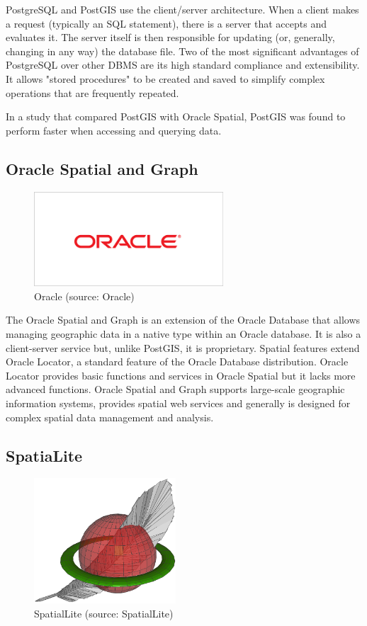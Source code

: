 PostgreSQL and PostGIS use the client/server architecture. When a
client makes a request (typically an SQL statement), there is a server
that accepts and evaluates it. The server itself is then responsible
for updating (or, generally, changing in any way) the database
file. Two of the most significant advantages of PostgreSQL over other
DBMS are its high standard compliance and extensibility. It allows
"stored procedures" to be created and saved to simplify complex
operations that are frequently repeated.

In a study that compared PostGIS with Oracle Spatial, PostGIS was
found to perform faster when accessing and querying
data.\cite{postgis}

	
\subsection{Oracle Spatial and Graph}

\begin{figure}[H] \centering
      \includegraphics[width=200pt]{./pictures/oracle.png}
      \caption[Oracle logo]{Oracle (source: Oracle)}
      \label{fig:Oracle}
  \end{figure}
  
  
The Oracle Spatial and Graph is an extension of the Oracle Database
that allows managing geographic data in a native type within an Oracle
database. It is also a client-server service but, unlike PostGIS, it
is proprietary. Spatial features extend Oracle Locator, a standard
feature of the Oracle Database distribution. Oracle Locator provides
basic functions and services in Oracle Spatial but it lacks more
advanced functions. Oracle Spatial and Graph supports large-scale
geographic information systems, provides spatial web services and
generally is designed for complex spatial data management and
analysis.

\subsection{SpatiaLite}

\begin{figure}[H] \centering
      \includegraphics[width=150pt]{./pictures/spatialite.png}
      \caption[SpatialLite logo]{SpatialLite (source: SpatialLite)}
      \label{fig:SpatialLite}
  \end{figure}
  
